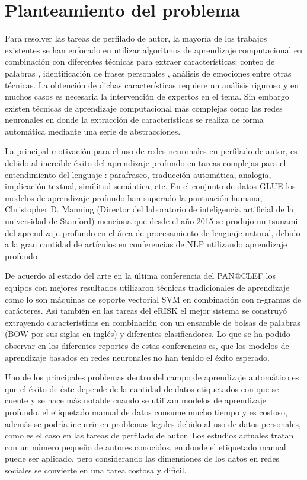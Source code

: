 \section{Planteamiento del problema}

Para resolver las tareas de perfilado de autor, la mayoría de los trabajos existentes se han enfocado en utilizar algoritmos de aprendizaje computacional en combinación con diferentes técnicas para extraer características: conteo de palabras \citep{Laserna2014}, identificación de frases personales \citep{Ortega-Mendoza2018}, análisis de emociones \citep{Aragon2019} entre otras técnicas. La obtención de dichas características requiere un análisis riguroso y en muchos casos es necesaria la intervención de expertos en el tema. Sin embargo existen técnicas de aprendizaje computacional más complejas como las redes neuronales en donde la extracción de características se realiza de forma automática mediante una serie de abstracciones.

La principal motivación para el uso de redes neuronales en perfilado de autor, es debido al increíble éxito del aprendizaje profundo en tareas complejas para el entendimiento del lenguaje : parafraseo, traducción automática, analogía, implicación  textual, similitud semántica, etc. En el conjunto de datos GLUE \citep{wang2018glue} los modelos de aprendizaje profundo han superado la puntuación humana, Christopher D. Manning (Director del laboratorio de inteligencia artificial de la universidad de Stanford) menciona que desde el año 2015 se produjo un tsunami del aprendizaje profundo en el área de procesamiento de lenguaje natural, debido a la gran cantidad de artículos en conferencias de NLP utilizando aprendizaje profundo \citep{Manning2015}.

De acuerdo al estado del arte en la última conferencia del PAN@CLEF los equipos con mejores resultados utilizaron técnicas tradicionales de aprendizaje como lo son máquinas de soporte vectorial SVM en combinación con n-gramas de carácteres. Así también en las tareas del eRISK el mejor sistema se construyó extrayendo características en combinación con un ensamble de bolsas de palabras (BOW por sus siglas en inglés) y diferentes clasificadores. Lo que se ha podido observar en los diferentes reportes de estas conferencias es, que los modelos de aprendizaje basados en redes neuronales no han tenido el éxito esperado. 

Uno de los principales problemas dentro del campo de aprendizaje automático es que el éxito de éste depende de la cantidad de datos etiquetados con que se cuente y se hace más notable cuando se utilizan modelos de aprendizaje profundo, el etiquetado manual de datos consume mucho tiempo y es costoso, además se podría incurrir en problemas legales debido al uso de datos personales, como es el caso en las tareas de perfilado de autor. Los estudios actuales  tratan con un número pequeño de autores conocidos, en donde el etiquetado manual puede ser aplicado, pero considerando las dimensiones de los datos en redes sociales se convierte en una tarea costosa y difícil.

